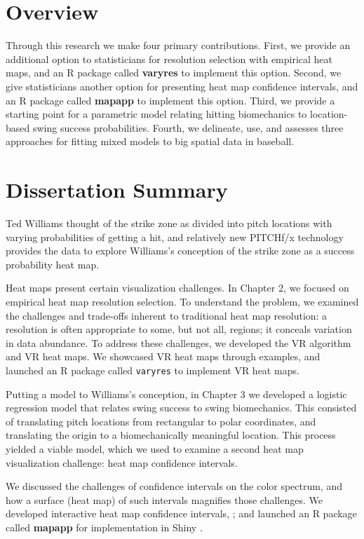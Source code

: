 \section{Overview} %

Through this research we make four primary contributions. First, we provide an additional option to statisticians for resolution selection with empirical heat maps, and an R package called {\bf varyres} to implement this option. Second, we give statisticians another option for presenting heat map confidence intervals, and an R package called {\bf mapapp} to implement this option. Third, we provide a starting point for a parametric model relating hitting biomechanics to location-based swing success probabilities. Fourth, we delineate, use, and assesses three approaches for fitting mixed models to big spatial data in baseball. 

\section{Dissertation Summary}

Ted Williams thought of the strike zone as divided into pitch locations with varying probabilities of getting a hit, and relatively new PITCHf/x\textsuperscript{\textregistered} technology provides the data to explore Williams's conception of the strike zone as a success probability heat map.

Heat maps present certain visualization challenges. In Chapter 2, we focused on empirical heat map resolution selection. To understand the problem, we examined the challenges and trade-offs inherent to traditional heat map resolution: a resolution is often appropriate to some, but not all, regions; it conceals variation in data abundance. To address these challenges, we developed the VR algorithm and VR heat maps. We showcased VR heat maps through examples, and launched an R package called \verb|varyres| to implement VR heat maps.

Putting a model to Williams's conception, in Chapter 3 we developed a logistic regression model that relates swing success to swing biomechanics. This consisted of translating pitch locations from rectangular to polar coordinates, and translating the origin to a biomechanically meaningful location. This process yielded a viable model, which we used to examine a second heat map visualization challenge: heat map confidence intervals.

We discussed the challenges of confidence intervals on the color spectrum, and how a surface (heat map) of such intervals magnifies those challenges. We developed interactive heat map confidence intervals, ; and launched an R package called {\bf mapapp} for implementation in Shiny \citep{Shiny}.

